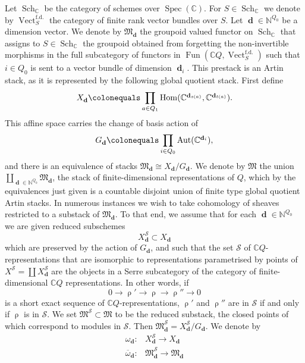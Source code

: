 \documentclass[a4paper,10pt]{amsart}
\renewcommand{\rho}{\uprho}
\newcommand{\SP}{\mathcal{S}}
\newcommand{\Mst}{\mathfrak{M}}
\DeclareMathOperator{\Hom}{Hom}
\DeclareMathOperator{\fd}{f.d.}
\DeclareMathOperator{\Fun}{Fun}
\DeclareMathOperator{\Vect}{Vect}
\DeclareMathOperator{\dd}{\mathbf{d}}
\DeclareMathOperator{\Aut}{Aut}
\newcommand{\Sch}[1]{\sch_{#1}}
\DeclareMathOperator{\sch}{Sch}
\DeclareMathOperator{\Spec}{Spec}
\begin{document}
Let $\Sch{\mathbb{C}}$ be the category of schemes over $\Spec(\mathbb{C})$.  For $S\in\Sch{\mathbb{C}}$ we denote by $\Vect_{S}^{\fd}$ the category of finite rank vector bundles over $S$.  Let $\dd\in\mathbb{N}^{Q_0}$ be a dimension vector.  We denote by $\Mst_{\dd}$ the groupoid valued functor on $\Sch{\mathbb{C}}$ that assigns to $S\in\Sch{\mathbb{C}}$ the groupoid obtained from forgetting the non-invertible morphisms in the full subcategory of functors in $\Fun(\mathbb{C} Q,\Vect_{S}^{\fd})$ such that $i\in Q_0$ is sent to a vector bundle of dimension $\dd_i$.  This prestack is an Artin stack, as it is represented by the following global quotient stack.  First define 
\begin{equation}
\label{Xdef}
X_{\dd}\colonequals \prod_{a\in Q_1}\Hom(\mathbb{C}^{\dd_{s(a)}},\mathbb{C}^{\dd_{t(a)}}).
\end{equation}
This affine space carries the change of basis action of 
\[
G_{\dd}\colonequals \prod_{i\in Q_0}\Aut(\mathbb{C}^{\dd_i}), 
\]
and there is an equivalence of stacks $\Mst_{\dd}\cong X_{\dd}/G_{\dd}$.  We denote by $\Mst$ the union $\coprod_{\dd\in\mathbb{N}^{Q_0}} \Mst_{\dd}$, the stack of finite-dimensional representations of $Q$, which by the equivalences just given is a countable disjoint union of finite type global quotient Artin stacks.
\smallbreak
In numerous instances we wish to take cohomology of sheaves restricted to a substack of $\Mst_{\dd}$.  To that end, we assume that for each $\dd\in\mathbb{N}^{Q_0}$ we are given reduced subschemes 
\begin{equation}
\label{Xspdef}
X^{\SP}_{\dd}\subset X_{\dd}
\end{equation}
which are preserved by the action of $G_{\dd}$, and such that the set $\mathcal{S}$ of $\mathbb{C}Q$-representations that are isomorphic to representations parametrised by points of $X^{\SP}=\coprod X_{\dd}^{\SP}$ are the objects in a Serre subcategory of the category of finite-dimensional $\mathbb{C}Q$ representations.  In other words, if 
\begin{equation}
\label{rhoses}
0\rightarrow \rho'\rightarrow \rho\rightarrow\rho''\rightarrow 0
\end{equation}
is a short exact sequence of $\mathbb{C}Q$-representations, $\rho'$ and $\rho''$ are in $\mathcal{S}$ if and only if $\rho$ is in $\mathcal{S}$.  We set $\Mst^{\SP}\subset \Mst$ to be the reduced substack, the closed points of which correspond to modules in $\mathcal{S}$.  Then $\Mst^{\SP}_{\dd}=X^{\SP}_{\dd}/G_{\dd}$.  We denote by 
\begin{align*}
\omega_{\dd}\colon &X_{\dd}^{\SP}\rightarrow X_{\dd}\\
\overline{\omega}_{\dd}\colon &\Mst_{\dd}^{\SP}\rightarrow\Mst_{\dd}
\end{align*}
\end{document}
